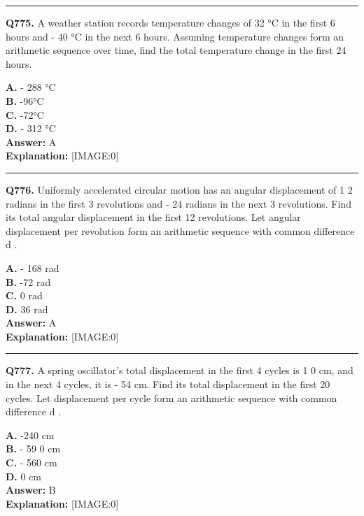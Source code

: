 \documentclass[12pt]{article}
\begin{document}
\hrule
\vspace{1em}


\noindent
\textbf{Q775.} A weather station records temperature changes of
32
°C in the first 6 hours and -
40
°C in the next 6 hours. Assuming temperature changes form an arithmetic sequence over time, find the total temperature change in the first 24 hours.



\textbf{A.} -
288
°C \\
\textbf{B.} -96°C \\
\textbf{C.} -72°C \\
\textbf{D.} -
312
°C \\

\textbf{Answer:} A \\
\textbf{Explanation:} [IMAGE:0]

\hrule
\vspace{1em}


\noindent
\textbf{Q776.} Uniformly accelerated circular motion
has an angular displacement of 1
2
radians in the first 3 revolutions and -
24
radians in the next 3 revolutions. Find its total angular displacement in the first 12 revolutions.
Let angular displacement per revolution form an arithmetic sequence with common difference
d
.



\textbf{A.} -
168
rad \\
\textbf{B.} -72 rad \\
\textbf{C.} 0 rad \\
\textbf{D.} 36 rad \\

\textbf{Answer:} A \\
\textbf{Explanation:} [IMAGE:0]

\hrule
\vspace{1em}


\noindent
\textbf{Q777.} A spring oscillator's total displacement in the first 4 cycles is 1
0
cm, and in the next 4 cycles, it is -
54
cm. Find its total displacement in the first 20 cycles.
Let displacement per cycle form an arithmetic sequence with common difference
d
.



\textbf{A.} -240 cm \\
\textbf{B.} -
59
0 cm \\
\textbf{C.} -
560
cm \\
\textbf{D.} 0 cm \\

\textbf{Answer:} B \\
\textbf{Explanation:} [IMAGE:0]
\end{document}
